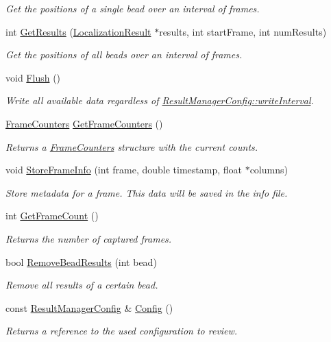 \begin{DoxyCompactItemize}
\begin{DoxyCompactList}\small\item\em Get the positions of a single bead over an interval of frames. \end{DoxyCompactList}\item 
int \hyperlink{class_result_manager_a8baf4f5befea704f8e63ef24af2b7c2f}{Get\+Results} (\hyperlink{struct_localization_result}{Localization\+Result} $\ast$results, int start\+Frame, int num\+Results)
\begin{DoxyCompactList}\small\item\em Get the positions of all beads over an interval of frames. \end{DoxyCompactList}\item 
void \hyperlink{class_result_manager_af33fd9c1dda86151405a08d826320794}{Flush} ()
\begin{DoxyCompactList}\small\item\em Write all available data regardless of \hyperlink{struct_result_manager_config_a24c57e2403e5012fc5900924db770611}{Result\+Manager\+Config\+::write\+Interval}. \end{DoxyCompactList}\item 
\hyperlink{struct_result_manager_1_1_frame_counters}{Frame\+Counters} \hyperlink{class_result_manager_af0e807e271c8626bcc1a01c498e2ad38}{Get\+Frame\+Counters} ()
\begin{DoxyCompactList}\small\item\em Returns a \hyperlink{struct_result_manager_1_1_frame_counters}{Frame\+Counters} structure with the current counts. \end{DoxyCompactList}\item 
void \hyperlink{class_result_manager_a0bbedc935395c1af29f175f81ab063c9}{Store\+Frame\+Info} (int frame, double timestamp, float $\ast$columns)
\begin{DoxyCompactList}\small\item\em Store metadata for a frame. This data will be saved in the info file. \end{DoxyCompactList}\item 
int \hyperlink{class_result_manager_a473002eab88049c663eab8c97cbf2d34}{Get\+Frame\+Count} ()
\begin{DoxyCompactList}\small\item\em Returns the number of captured frames. \end{DoxyCompactList}\item 
bool \hyperlink{class_result_manager_aaa749abf3e879376677dc051745ed665}{Remove\+Bead\+Results} (int bead)
\begin{DoxyCompactList}\small\item\em Remove all results of a certain bead. \end{DoxyCompactList}\item 
const \hyperlink{struct_result_manager_config}{Result\+Manager\+Config} \& \hyperlink{class_result_manager_a6a54dc8335c40471d40312f383df178c}{Config} ()
\begin{DoxyCompactList}\small\item\em Returns a reference to the used configuration to review. \end{DoxyCompactList}\end{DoxyCompactItemize}
